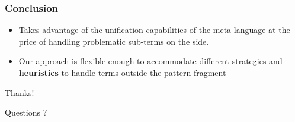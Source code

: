 \documentclass{pres}
\begin{document}
\begin{frame}
  \frametitle{Conclusion}

  \begin{itemize}
    \item Takes advantage of the unification capabilities of the meta language
          at the price of handling problematic sub-terms on the side.
    \item Our approach is flexible enough to accommodate different strategies
          and \textbf{heuristics} to handle terms outside the pattern fragment
  \end{itemize}

\end{frame}

\begin{frame}

  \centering
    {\Huge\calligra Thanks!}

  \pause
  \begin{center}
    Questions ?
  \end{center}

\end{frame}
\end{document}
